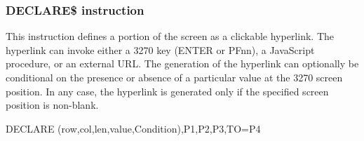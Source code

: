 \documentclass[letterpaper,10pt,english]{sphinxmanual}
\begin{document}
\subsubsection{DECLARE\$ instruction}
\label{\detokenize{User_Guide:declare-instruction}}
This instruction defines a portion of the screen as a clickable hyperlink. The hyperlink can invoke either a 3270 key (ENTER or PFnn), a JavaScript procedure, or an external URL. The generation of the hyperlink can optionally be conditional on the presence or absence of a particular value at the 3270 screen position. In any case, the hyperlink is generated only if the specified screen position is non-blank.

\begin{sphinxVerbatim}[commandchars=\\\{\}]
DECLARE\PYGZdl{} (row,col,len,\PYGZsq{}value\PYGZsq{},Condition),P1,P2,P3,TO=P4
\end{sphinxVerbatim}
\end{document}
